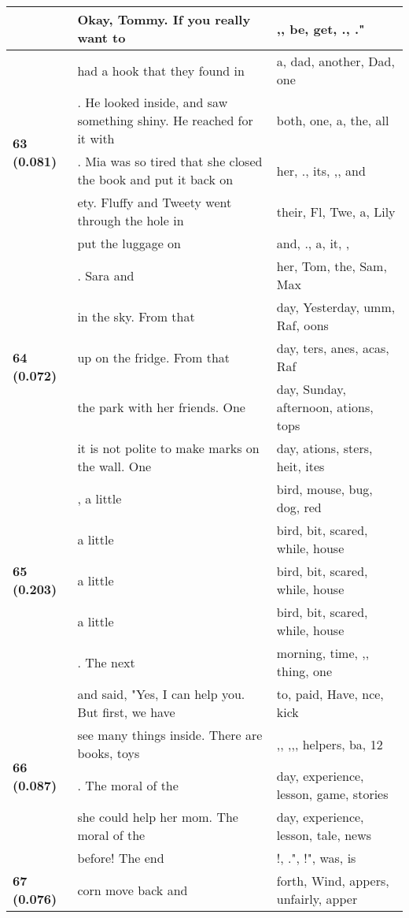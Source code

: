 \documentclass{article}
\begin{document}
\begin{adjustbox}{max width=\textwidth}
\begin{tabular}{p{} p{} p{}}
 & Okay, Tommy. If you really want to & ,,  be,  get, ., ." \\
\midrule
\multirow{5}{*}{\textbf{63 (0.081)}} & had a hook that they found in & a,  dad,  another,  Dad,  one \\
 & . He looked inside, and saw something shiny. He reached for it with & both,  one,  a,  the,  all \\
 & . Mia was so tired that she closed the book and put it back on & her, .,  its, ,,  and \\
 & ety.  Fluffy and Tweety went through the hole in & their,  Fl,  Twe,  a,  Lily \\
 & put the luggage on & and, .,  a,  it, , \\
\midrule
\multirow{5}{*}{\textbf{64 (0.072)}} & .  Sara and & her,  Tom,  the,  Sam,  Max \\
 & in the sky. From that & day, Yesterday, umm,  Raf, oons \\
 & up on the fridge. From that & day, ters, anes, acas,  Raf \\
 & the park with her friends. One & day,  Sunday,  afternoon, ations, tops \\
 & it is not polite to make marks on the wall.  One & day, ations, sters, heit, ites \\
\midrule
\multirow{5}{*}{\textbf{65 (0.203)}} & , a little & bird,  mouse,  bug,  dog,  red \\
 & a little & bird,  bit,  scared,  while,  house \\
 & a little & bird,  bit,  scared,  while,  house \\
 & a little & bird,  bit,  scared,  while,  house \\
 & . The next & morning,  time, ,,  thing,  one \\
\midrule
\multirow{5}{*}{\textbf{66 (0.087)}} & and said, "Yes, I can help you. But first, we have & to,  paid, Have, nce, kick \\
 & see many things inside. There are books, toys & ,, ,,,  helpers,  ba,  12 \\
 & .  The moral of the & day,  experience,  lesson,  game,  stories \\
 & she could help her mom.  The moral of the & day,  experience,  lesson,  tale,  news \\
 & before! The end & !, .", !",  was,  is \\
\midrule
\multirow{5}{*}{\textbf{67 (0.076)}} & corn move back and & forth, Wind, appers,  unfairly, apper \\

\end{tabular}
\end{adjustbox}
\end{document}

